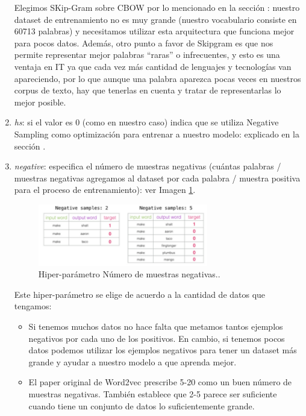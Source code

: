\documentclass[12pt,a4paper]{article}
\begin{document}
\begin{sloppypar}
\begin{enumerate}
Elegimos SKip-Gram sobre CBOW por lo mencionado en la sección \textit{}: nuestro dataset de entrenamiento no es muy grande (nuestro vocabulario consiste en 60713 palabras) y necesitamos utilizar esta arquitectura que funciona mejor para pocos datos. Además, otro punto a favor de Skipgram es que {nos permite representar mejor palabras “raras” o infrecuentes}, y esto es una ventaja en IT ya que cada vez más cantidad de lenguajes y tecnologías van apareciendo, por lo que aunque una palabra aparezca pocas veces en nuestros corpus de texto, hay que tenerlas en cuenta y tratar de representarlas lo mejor posible.

\item \textit{hs}: si el valor es 0 (como en nuestro caso) indica que se utiliza Negative Sampling como optimización para entrenar a nuestro modelo: explicado en la sección \textit{}.

\item \textit{negative}: especifica el número de muestras negativas (cuántas palabras / muestras negativas agregamos al dataset por cada palabra / muestra positiva para el proceso de entrenamiento): ver Imagen \ref{fig:6_Neg_samples}.

\begin{figure}[H] 
 \centering
 \includegraphics[width=0.7\textwidth]{images/implementacion_5/6_Neg_samples.png}
\captionsetup{justification=centering,margin=2cm}
 \caption{Hiper-parámetro Número de muestras negativas.\cite{datitos_nlp}.}
 \label{fig:6_Neg_samples}
\end{figure}

Este hiper-parámetro se elige de acuerdo a la cantidad de datos que tengamos\cite{datitos_nlp}:
\begin{itemize}
\item Si tenemos muchos datos no hace falta que metamos tantos ejemplos negativos por cada uno de los positivos. En cambio, si tenemos pocos datos podemos utilizar los ejemplos negativos para tener un dataset más grande y ayudar a nuestro modelo a que aprenda mejor. 
\item El paper original de Word2vec\cite{NLP_11} prescribe 5-20 como un buen número de muestras negativas. También establece que 2-5 parece ser suficiente cuando tiene un conjunto de datos lo suficientemente grande.
\end{itemize}


\end{enumerate}
\end{sloppypar}
\end{document}
